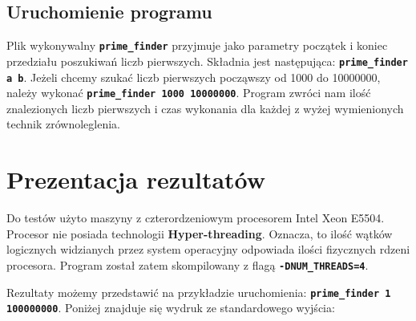 \documentclass[12pt, twoside, hidelinks, a4paper]{article}
\begin{document}
\subsection{Uruchomienie programu}
Plik wykonywalny \textbf{\texttt{prime\_finder}} przyjmuje jako parametry początek i koniec przedziału poszukiwań liczb pierwszych. Składnia jest następująca: \textbf{\texttt{prime\_finder a b}}. Jeżeli chcemy szukać liczb pierwszych począwszy od 1000 do 10000000, należy wykonać \textbf{\texttt{prime\_finder 1000 10000000}}. Program zwróci nam ilość znalezionych liczb pierwszych i czas wykonania dla każdej z wyżej wymienionych technik zrównoleglenia.

\section{Prezentacja rezultatów}
Do testów użyto maszyny z czterordzeniowym procesorem Intel Xeon E5504. Procesor nie posiada technologii \textbf{Hyper-threading}. Oznacza, to ilość wątków logicznych widzianych przez system operacyjny odpowiada ilości fizycznych rdzeni procesora. Program został zatem skompilowany z flagą \textbf{\texttt{-DNUM\_THREADS=4}}.

Rezultaty możemy przedstawić na przykładzie uruchomienia: \textbf{\texttt{prime\_finder 1 100000000}}. Poniżej znajduje się wydruk ze standardowego wyjścia:

\end{document}
